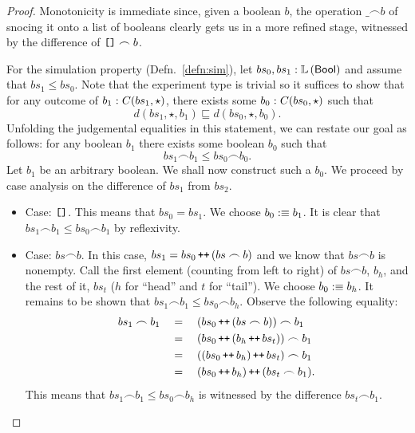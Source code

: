 \begin{proof}
  Monotonicity is immediate since, given a boolean $b$, the operation $\_ \frown b$ of snocing
  it onto a list of booleans clearly gets us in a more refined stage, witnessed by the
  difference of $\text{\texttt{[]}}{} \frown b$.

  For the simulation property (Defn.~\ref{defn:sim}), let $bs_0, bs_1:\mathbb{L}\left(\mathsf{Bool}{}\right)$
  and assume that $bs_1 \le bs_0$. Note that the experiment type is trivial so it suffices
  to show that for any outcome of $b_1\hspace{0.1mm}:\hspace{0.1mm}C(bs_1, \star)$, there exists some
  $b_0\hspace{0.1mm}:\hspace{0.1mm}C(bs_0, \star)$ such that
  \begin{equation*}
    d(bs_1, \star, b_1) \sqsubseteq d(bs_0, \star, b_0).
  \end{equation*}
  Unfolding the judgemental equalities in this statement, we can restate our goal as
  follows: for any boolean $b_1$ there exists some boolean $b_0$ such that
  \begin{equation*}
    bs_1 \frown b_1 \le bs_0 \frown b_0.
  \end{equation*}
  Let $b_1$ be an arbitrary boolean. We shall now construct such a $b_0$. We proceed by
  case analysis on the difference of $bs_1$ from $bs_2$.
  \begin{itemize}
    \item Case: $\text{\texttt{[]}}{}$. This means that $bs_0 = bs_1$. We choose
      $b_0 :\equiv b_1$. It is clear that $bs_1 \frown b_1 \le bs_0 \frown b_1$ by reflexivity.
    \item Case: $bs \frown b$. In this case, $bs_1 = bs_0 \operatorname{\text{\texttt{++}}}{} (bs \frown b)$ and we know that
      $bs \frown b$ is nonempty. Call the first element (counting from left to right) of $bs \frown
      b$, $b_h$, and the rest of it, $bs_t$ ($h$ for ``head'' and $t$ for ``tail''). We
      choose $b_0 :\equiv b_h$. It remains to be shown that $bs_1 \frown b_1 \le bs_0 \frown b_h$. Observe
      the following equality:
      \begin{align*}
        bs_1 \frown b_1 \quad&=\quad (bs_0 \operatorname{\text{\texttt{++}}}{} (bs \frown b)) \frown b_1             \\
                   \quad&=\quad (bs_0 \operatorname{\text{\texttt{++}}}{} (b_h \operatorname{\text{\texttt{++}}}{} bs_t)) \frown b_1 \\
                   \quad&=\quad ((bs_0 \operatorname{\text{\texttt{++}}}{} b_h) \operatorname{\text{\texttt{++}}}{} bs_t) \frown b_1 \\
                   \quad&=\quad (bs_0 \operatorname{\text{\texttt{++}}}{} b_h) \operatorname{\text{\texttt{++}}}{} (bs_t \frown b_1) .
      \end{align*}
      This means that $bs_1 \frown b_1 \le bs_0 \frown b_h$ is witnessed by the difference
      $bs_t \frown b_1$.
  \end{itemize}
\end{proof}

